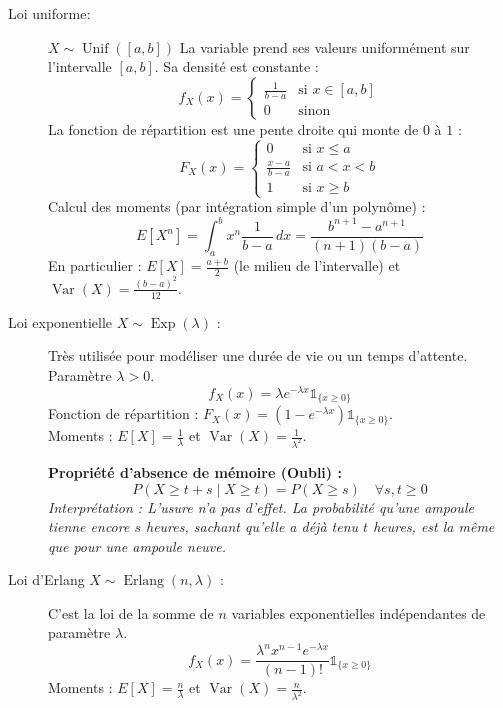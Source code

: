 \begin{description}
    \item[Loi uniforme:]  $X \sim \operatorname{Unif}([a,b])$ 
    La variable prend ses valeurs uniformément sur l'intervalle $[a,b]$. Sa densité est constante :
    \[
    f_X(x) = \begin{cases}
        \frac{1}{b-a} & \text{si } x \in [a,b] \\
        0 & \text{sinon}
    \end{cases}
    \]
    La fonction de répartition est une pente droite qui monte de $0$ à $1$ :
    \[
    F_X(x) = \begin{cases}
        0 & \text{si } x \le a \\
        \frac{x-a}{b-a} & \text{si } a < x < b \\
        1 & \text{si } x \ge b
    \end{cases}
    \]
    Calcul des moments (par intégration simple d'un polynôme) :
    \[
    E[X^n] = \int_{a}^{b} x^n \frac{1}{b-a} \, dx = \frac{b^{n+1}-a^{n+1}}{(n+1)(b-a)}
    \]
    En particulier : $E[X] = \frac{a+b}{2}$ (le milieu de l'intervalle) et $\operatorname{Var}(X) = \frac{(b-a)^2}{12}$.

    \item[Loi exponentielle $X \sim \operatorname{Exp}(\lambda)$ :]
    Très utilisée pour modéliser une durée de vie ou un temps d'attente. Paramètre $\lambda > 0$.
    \[
    f_X(x) = \lambda e^{-\lambda x} \mathds{1}_{\{x \ge 0\}}
    \]
    Fonction de répartition : $F_X(x) = (1 - e^{-\lambda x}) \mathds{1}_{\{x \ge 0\}}$. \\
    Moments : $E[X] = \frac{1}{\lambda}$ et $\operatorname{Var}(X) = \frac{1}{\lambda^2}$.
    
    \textbf{Propriété d'absence de mémoire (Oubli) :}
    \[
    P(X \ge t + s \mid X \ge t) = P(X \ge s) \quad \forall s,t \ge 0
    \]
    \textit{Interprétation : L'usure n'a pas d'effet. La probabilité qu'une ampoule tienne encore $s$ heures, sachant qu'elle a déjà tenu $t$ heures, est la même que pour une ampoule neuve.}

    \item[Loi d'Erlang $X \sim \operatorname{Erlang}(n, \lambda)$ :]
    C'est la loi de la somme de $n$ variables exponentielles indépendantes de paramètre $\lambda$.
    \[
    f_X(x) = \frac{\lambda^n x^{n-1} e^{-\lambda x}}{(n-1)!} \mathds{1}_{\{x \ge 0\}}
    \]
    Moments : $E[X] = \frac{n}{\lambda}$ et $\operatorname{Var}(X) = \frac{n}{\lambda^2}$.


\end{description}
